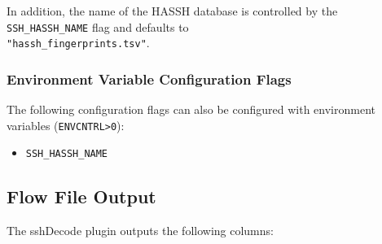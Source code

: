 \documentclass[documentation]{subfiles}
\begin{document}
In addition, the name of the HASSH database is controlled by the {\tt SSH\_HASSH\_NAME} flag and defaults to\\
{\tt "hassh\_fingerprints.tsv"}.

\subsubsection{Environment Variable Configuration Flags}
The following configuration flags can also be configured with environment variables ({\tt ENVCNTRL>0}):
\begin{itemize}
    \item {\tt SSH\_HASSH\_NAME}
\end{itemize}

\subsection{Flow File Output}
The sshDecode plugin outputs the following columns:
\end{document}
